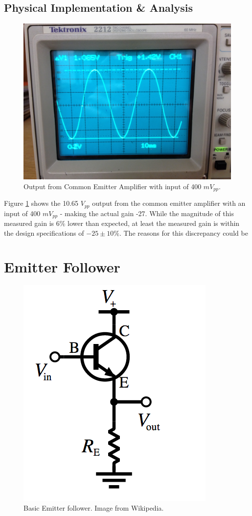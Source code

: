 \documentclass[12pt,letterpaper]{report}
\newlength \figwidth
\begin{document}
\subsection*{Physical Implementation \& Analysis}

\begin{figure}[H]
\centering
\includegraphics[width=\figwidth, keepaspectratio=true]{lab6_images/simple_output.jpg}
\caption{Output from Common Emitter Amplifier with input of 400  $mV_{pp}$.}
\label{fig:simple_output}
\end{figure}

Figure \ref{fig:simple_output} shows the 10.65 $V_{pp}$ output from the common emitter amplifier with an input of 400 $mV_{pp}$ - making the actual gain -27. While the magnitude of this measured gain is 6\% lower than expected, at least the measured gain is within the design specifications of $-25 \pm 10\%$. The reasons for this discrepancy could be 

\section*{Emitter Follower}

\begin{figure}[H]
\centering
\includegraphics[width=0.2\linewidth, keepaspectratio=true]{lab6_images/emitter_follower.png}
\caption{Basic Emitter follower. Image from Wikipedia.}
\label{fig:emitter_follower}
\end{figure}
\end{document}

